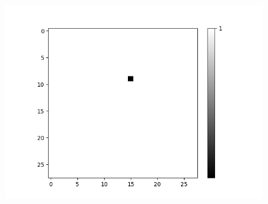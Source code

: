 \begin{figure}[H]
\begin{minipage}[b]{0.19\textwidth}
		\includegraphics[width=\textwidth]{LoAE(AND)(20LF)/True/Feature-17.png}
		\label{}
	\end{minipage}
	
	\medskip
	

\end{figure}

